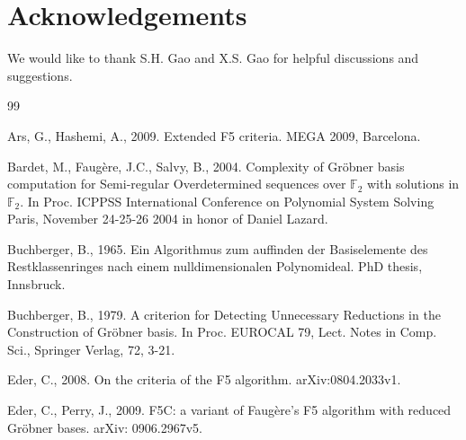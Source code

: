 \documentclass[preprint,authoryear,3p,12pt]{elsarticle}
\def\F{{\mathbb{F}}}
\def\gr{{Gr\"obner }}
\begin{document}
\section{Acknowledgements}

We would like to thank S.H. Gao and X.S. Gao for   helpful discussions and suggestions.




\begin{thebibliography}{99}

Ars, G., Hashemi, A., 2009. Extended F5 criteria. MEGA 2009,
Barcelona.

Bardet, M., Faug\`ere, J.C., Salvy, B., 2004. Complexity of \gr
basis computation for Semi-regular Overdetermined sequences over
$\F_2$ with solutions in $\F_2$. In Proc. ICPPSS International
Conference on Polynomial System Solving Paris, November 24-25-26
2004 in honor of Daniel Lazard.



Buchberger, B., 1965. Ein Algorithmus zum auffinden der
Basiselemente des Restklassenringes nach einem nulldimensionalen
Polynomideal. PhD thesis, Innsbruck.

Buchberger, B., 1979. A criterion for Detecting Unnecessary
Reductions in the Construction of \gr basis. In Proc. EUROCAL 79,
Lect. Notes in Comp. Sci., Springer Verlag, 72, 3-21.



Eder, C., 2008. On the criteria of the F5 algorithm.
arXiv:0804.2033v1.

Eder, C., Perry, J., 2009. F5C: a variant of Faug\`ere's F5
algorithm with reduced \gr bases. arXiv: 0906.2967v5.


\end{thebibliography}
\end{document}
